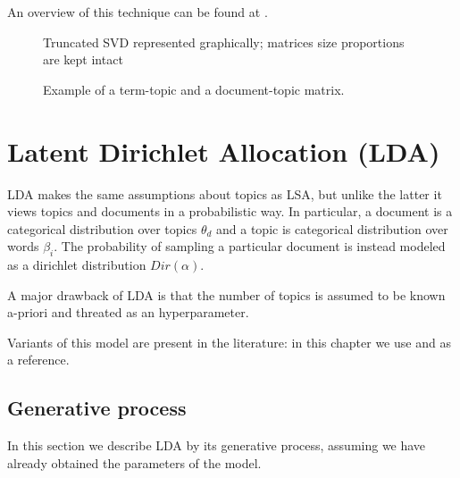An overview of this technique can be found at \cite{doi:10.1002/aris.1440380105}.

\begin{figure}[h]
    \centering
    \caption{Truncated SVD represented graphically; matrices size proportions are kept intact}
    \label{fig:svd}
\end{figure}

\begin{figure}[h]
    \centering
    \caption{Example of a term-topic and a document-topic matrix.}
    \label{fig:topicmat}
\end{figure}

\section{Latent Dirichlet Allocation (LDA)}
LDA makes the same assumptions about topics as LSA, but unlike the latter it views topics and documents in a probabilistic way.
In particular, a document is a categorical distribution over topics $\theta_d$ and a topic is categorical distribution over words $\beta_i$.
The probability of sampling a particular document is instead modeled as a dirichlet distribution $Dir(\alpha)$.

A major drawback of LDA is that the number of topics is assumed to be known a-priori and threated as an hyperparameter.

Variants of this model are present in the literature: in this chapter we use \cite{10.1145/2107736.2107741} and \cite{DBLP:journals/jmlr/BleiNJ03} as a reference.

\subsection{Generative process} \label{gp}
In this section we describe LDA by its generative process, assuming we have already obtained the parameters of the model.


